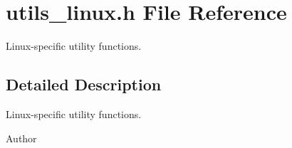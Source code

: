 \section{utils\-\_\-linux.\-h File Reference}
\label{utils__linux_8h}


Linux-\/specific utility functions.  




\subsection{Detailed Description}
Linux-\/specific utility functions. \begin{DoxyAuthor}{Author}

\end{DoxyAuthor}
